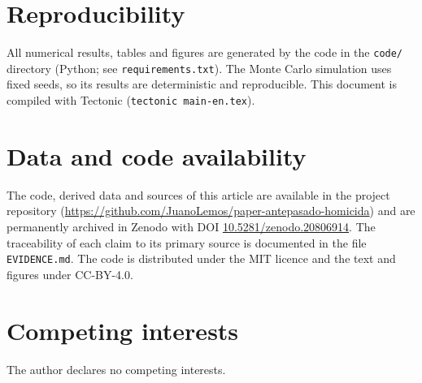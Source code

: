 \documentclass[11pt]{article}
\begin{document}
\section*{Reproducibility}
All numerical results, tables and figures are generated by the code in the
\texttt{code/} directory (Python; see \texttt{requirements.txt}). The Monte Carlo
simulation uses fixed seeds, so its results are deterministic and reproducible.
This document is compiled with Tectonic (\texttt{tectonic main-en.tex}).

\section*{Data and code availability}
The code, derived data and sources of this article are available in the project
repository (\url{https://github.com/JuanoLemos/paper-antepasado-homicida}) and are
permanently archived in Zenodo with DOI
\href{https://doi.org/10.5281/zenodo.20806914}{10.5281/zenodo.20806914}. The
traceability of each claim to its primary source is documented in the file
\texttt{EVIDENCE.md}. The code is distributed under the MIT licence and the text
and figures under CC-BY-4.0.

\section*{Competing interests}
The author declares no competing interests.



\end{document}
